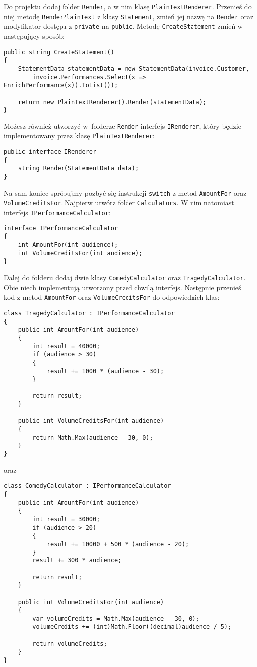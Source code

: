 Do projektu dodaj folder \texttt{Render}, a w nim klasę \texttt{PlainTextRenderer}. Przenieś do niej metodę \texttt{RenderPlainText} z klasy \texttt{Statement}, zmień jej nazwę na \texttt{Render} oraz modyfikator dostępu z \texttt{private} na \texttt{public}. Metodę \texttt{CreateStatement} zmień w następujący sposób:
\begin{lstlisting}
public string CreateStatement()
{
	StatementData statementData = new StatementData(invoice.Customer, 
		invoice.Performances.Select(x => EnrichPerformance(x)).ToList());
	
	return new PlainTextRenderer().Render(statementData);
}
\end{lstlisting}
Możesz również utworzyć w~folderze \texttt{Render} interfejs \texttt{IRenderer}, który będzie implementowany przez klasę \texttt{PlainTextRenderer}:
\begin{lstlisting}
public interface IRenderer
{
	string Render(StatementData data);
}
\end{lstlisting}


Na sam koniec spróbujmy pozbyć się instrukcji \texttt{switch} z metod \texttt{AmountFor} oraz \texttt{VolumeCreditsFor}. Najpierw utwórz folder \texttt{Calculators}. W nim natomiast interfejs \texttt{IPerformanceCalculator}:
\begin{lstlisting}
interface IPerformanceCalculator
{
	int AmountFor(int audience);
	int VolumeCreditsFor(int audience);
}
\end{lstlisting}
Dalej do folderu dodaj dwie klasy \texttt{ComedyCalculator} oraz \texttt{TragedyCalculator}. Obie niech implementują utworzony przed chwilą interfejs. Następnie przenieś kod z metod \texttt{AmountFor} oraz \texttt{VolumeCreditsFor} do odpowiednich klas:
\begin{lstlisting}
class TragedyCalculator : IPerformanceCalculator
{
	public int AmountFor(int audience)
	{
		int result = 40000;
		if (audience > 30)
		{
			result += 1000 * (audience - 30);
		}
		
		return result;
	}
	
	public int VolumeCreditsFor(int audience)
	{
		return Math.Max(audience - 30, 0);
	}
}
\end{lstlisting}
oraz 
\begin{lstlisting}
class ComedyCalculator : IPerformanceCalculator
{
	public int AmountFor(int audience)
	{
		int result = 30000;
		if (audience > 20)
		{
			result += 10000 + 500 * (audience - 20);
		}
		result += 300 * audience;
		
		return result;
	}
	
	public int VolumeCreditsFor(int audience)
	{
		var volumeCredits = Math.Max(audience - 30, 0);
		volumeCredits += (int)Math.Floor((decimal)audience / 5);
		
		return volumeCredits;
	}
}
\end{lstlisting}


